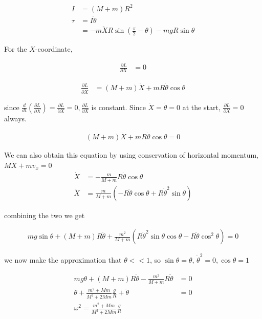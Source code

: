 \documentclass{article}
\begin{document}
\begin{align*}
I &= (M+m)R^2 \\
\tau &= I \ddot\theta \\
&= - m\ddot X R \sin(\frac{\pi}{2} - \theta) - mgR\sin\theta
\end{align*}

For the $X$-coordinate,

\begin{align*}
\frac{\partial L}{\partial X} &= 0
\end{align*}

\begin{align*}
\frac{\partial L}{\partial \dot X} &= (M+m) \dot{X} + mR\dot\theta\cos\theta
\end{align*}

since $\frac{d}{dt}\left(\frac{\partial L}{\partial \dot X}\right) = \frac{\partial L}{\partial X} = 0, \frac{\partial L}{\partial X}$ is constant. Since $\dot X = \dot\theta = 0$ at the start, $\frac{\partial L}{\partial X} = 0$ always.

\begin{align*}
(M+m) \dot{X} + mR\dot\theta\cos\theta = 0
\end{align*}

We can also obtain this equation by using conservation of horizontal momentum, $M\dot X + mv_x = 0$
\begin{align*}
\dot{X} &= -\frac{m}{M+m} R\dot\theta\cos\theta \\
\ddot{X} &= \frac{m}{M+m} (-R\ddot\theta\cos\theta + R\dot\theta^2\sin\theta)
\end{align*}

combining the two we get

\begin{align*}
mg\sin\theta + (M+m) R \ddot{\theta} + \frac{m^2}{M+m}(R\dot\theta^2\sin\theta\cos\theta - R\ddot\theta\cos^2\theta) = 0
\end{align*}

we now make the approximation that $\theta << 1$, so $\sin\theta = \theta$, $\dot\theta^2 = 0, \cos\theta = 1$

\begin{align*}
mg\theta + (M+m) R \ddot{\theta} - \frac{m^2}{M+m}R\ddot\theta &= 0 \\
\ddot\theta + \frac{m^2 + Mm}{M^2 + 2Mm}\frac{g}{R} + \ddot\theta &= 0 \\
\omega^2 = \frac{m^2 + Mm}{M^2 + 2Mm}\frac{g}{R}
\end{align*}
\end{document}
